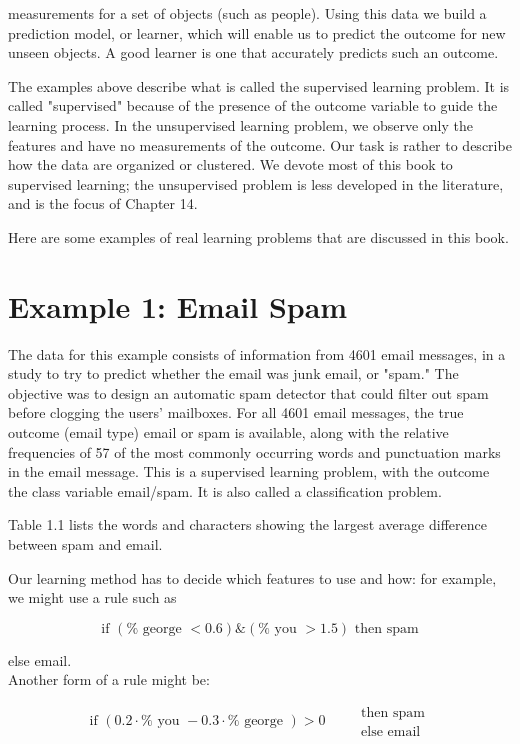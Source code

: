 \documentclass[10pt]{article}
\begin{document}
measurements for a set of objects (such as people). Using this data we build a prediction model, or learner, which will enable us to predict the outcome for new unseen objects. A good learner is one that accurately predicts such an outcome.

The examples above describe what is called the supervised learning problem. It is called "supervised" because of the presence of the outcome variable to guide the learning process. In the unsupervised learning problem, we observe only the features and have no measurements of the outcome. Our task is rather to describe how the data are organized or clustered. We devote most of this book to supervised learning; the unsupervised problem is less developed in the literature, and is the focus of Chapter 14.

Here are some examples of real learning problems that are discussed in this book.

\section*{Example 1: Email Spam}
The data for this example consists of information from 4601 email messages, in a study to try to predict whether the email was junk email, or "spam." The objective was to design an automatic spam detector that could filter out spam before clogging the users' mailboxes. For all 4601 email messages, the true outcome (email type) email or spam is available, along with the relative frequencies of 57 of the most commonly occurring words and punctuation marks in the email message. This is a supervised learning problem, with the outcome the class variable email/spam. It is also called a classification problem.

Table 1.1 lists the words and characters showing the largest average difference between spam and email.

Our learning method has to decide which features to use and how: for example, we might use a rule such as

$$
\text { if }(\% \text { george }<0.6) \&(\% \text { you }>1.5) \text { then spam }
$$

else email.\\
Another form of a rule might be:

$$
\text { if }(0.2 \cdot \% \text { you }-0.3 \cdot \% \text { george })>0 \quad \begin{aligned}
& \text { then spam } \\
& \text { else email }
\end{aligned}
$$
\end{document}
